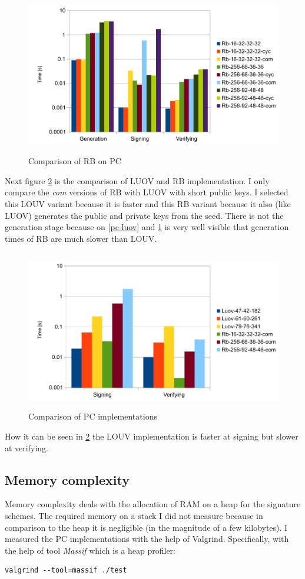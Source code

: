 \documentclass[thesis=M,english]{FITthesis}[2019/12/23]
\begin{document}
\begin{figure}[H]
\centering
\includegraphics[width=13cm,height=7cm]{images/pc-rb.pdf}
\caption{Comparison of RB on PC}
\label{pc-rb}
\end{figure}

\noindent
Next figure \ref{pc-all} is the comparison of LUOV and RB implementation. I only compare the \textit{com} versions of RB with LUOV with short public keys. I selected this LOUV variant because it is faster and this RB variant because it also (like LUOV) generates the public and private keys from the seed.
There is not the generation stage because on \ref{pc-luov} and \ref{pc-rb} is very well visible that generation times of RB are much slower than LOUV.

\begin{figure}[H]
\centering
\includegraphics[width=13cm,height=7cm]{images/pc-all.pdf}
\caption{Comparison of PC implementations}
\label{pc-all}
\end{figure}

\noindent
How it can be seen in \ref{pc-all} the LOUV implementation is faster at signing but slower at verifying.

\subsection{Memory complexity}\label{pc-mem-measurement}
Memory complexity deals with the allocation of RAM on a heap for the signature schemes. The required memory on a stack I did not measure because in comparison to the heap it is negligible (in the magnitude of a few kilobytes). I measured the PC implementations with the help of Valgrind. Specifically, with the help of tool \textit{Massif} which is a heap profiler:
\begin{lstlisting}[frame=single]
valgrind --tool=massif ./test
\end{lstlisting}
\end{document}
